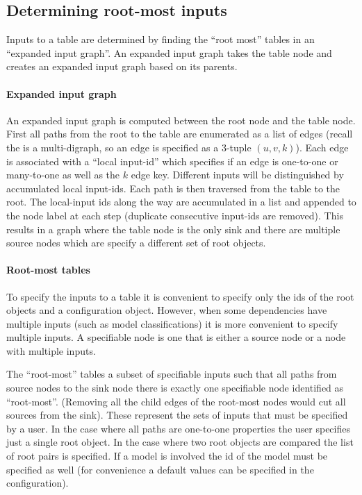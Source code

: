 \subsection{Determining root-most inputs}

Inputs to a table are determined by finding the ``root most'' tables
  in an ``expanded input graph''.
An expanded input graph takes the table node and creates an expanded
  input graph based on its parents.

\paragraph{Expanded input graph}
An expanded input graph is computed between the root node and the
  table node.
First all paths from the root to the table are enumerated as a list of
  edges (recall the \depcache{} is a multi-digraph, so an edge is
  specified as a 3-tuple $(u, v, k)$).
Each edge is associated with a ``local input-id'' which specifies if
  an edge is one-to-one or many-to-one as well as the $k$ edge key.
Different inputs will be distinguished by accumulated local input-ids.
Each path is then traversed from the table to the root.
The local-input ids along the way are accumulated in a list and
  appended to the node label at each step (duplicate consecutive
  input-ids are removed).
This results in a graph where the table node is the only sink and
  there are multiple source nodes which are specify a different set of
  root objects.

\paragraph{Root-most tables}
To specify the inputs to a table it is convenient to specify only the
  ids of the root objects and a configuration object.
However, when some dependencies have multiple inputs (such as model
  classifications) it is more convenient to specify multiple inputs.
A specifiable node is one that is either a source node or a node with
  multiple inputs.

The ``root-most'' tables a subset of specifiable inputs such that all
  paths from source nodes to the sink node there is exactly one
  specifiable node identified as ``root-most''.
(Removing all the child edges of the root-most nodes would cut all
  sources from the sink).
These represent the sets of inputs that must be specified by a user.
In the case where all paths are one-to-one properties the user
  specifies just a single root object.
In the case where two root objects are compared the list of root pairs
  is specified.
If a model is involved the id of the model must be specified as well
  (for convenience a default values can be specified in the
  configuration).

